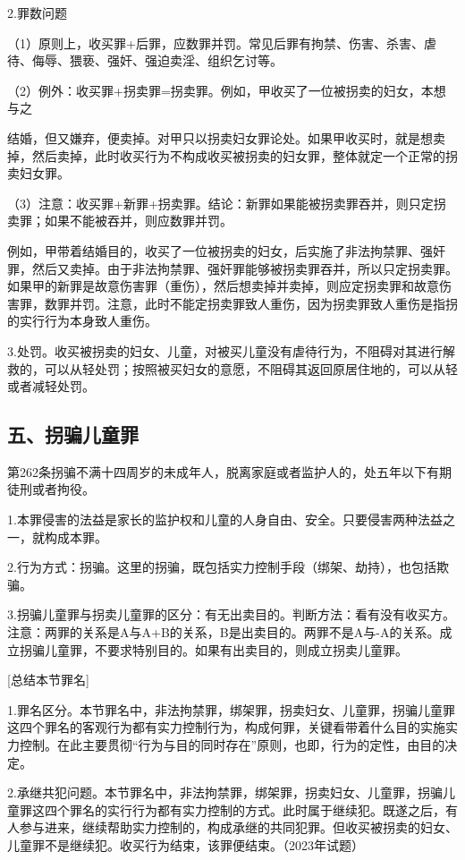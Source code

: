 2.罪数问题

（1）原则上，收买罪+后罪，应数罪并罚。常见后罪有拘禁、伤害、杀害、虐待、侮辱、猥亵、强奸、强迫卖淫、组织乞讨等。

（2）例外：收买罪+拐卖罪=拐卖罪。例如，甲收买了一位被拐卖的妇女，本想与之

结婚，但又嫌弃，便卖掉。对甲只以拐卖妇女罪论处。如果甲收买时，就是想卖掉，然后卖掉，此时收买行为不构成收买被拐卖的妇女罪，整体就定一个正常的拐卖妇女罪。

（3）注意：收买罪+新罪+拐卖罪。结论：新罪如果能被拐卖罪吞并，则只定拐卖罪；如果不能被吞并，则应数罪并罚。

例如，甲带着结婚目的，收买了一位被拐卖的妇女，后实施了非法拘禁罪、强奸罪，然后又卖掉。由于非法拘禁罪、强奸罪能够被拐卖罪吞并，所以只定拐卖罪。如果甲的新罪是故意伤害罪（重伤），然后想卖掉并卖掉，则应定拐卖罪和故意伤害罪，数罪并罚。注意，此时不能定拐卖罪致人重伤，因为拐卖罪致人重伤是指拐的实行行为本身致人重伤。

3.处罚。收买被拐卖的妇女、儿童，对被买儿童没有虐待行为，不阻碍对其进行解救的，可以从轻处罚；按照被买妇女的意愿，不阻碍其返回原居住地的，可以从轻或者减轻处罚。

\subsection*{五、拐骗儿童罪}

第262条拐骗不满十四周岁的未成年人，脱离家庭或者监护人的，处五年以下有期徒刑或者拘役。

1.本罪侵害的法益是家长的监护权和儿童的人身自由、安全。只要侵害两种法益之一，就构成本罪。

2.行为方式：拐骗。这里的拐骗，既包括实力控制手段（绑架、劫持），也包括欺骗。

3.拐骗儿童罪与拐卖儿童罪的区分：有无出卖目的。判断方法：看有没有收买方。注意：两罪的关系是A与A+B的关系，B是出卖目的。两罪不是A与-A的关系。成立拐骗儿童罪，不要求特别目的。如果有出卖目的，则成立拐卖儿童罪。

[总结本节罪名]

1.罪名区分。本节罪名中，非法拘禁罪，绑架罪，拐卖妇女、儿童罪，拐骗儿童罪这四个罪名的客观行为都有实力控制行为，构成何罪，关键看带着什么目的实施实力控制。在此主要贯彻“行为与目的同时存在”原则，也即，行为的定性，由目的决定。


2.承继共犯问题。本节罪名中，非法拘禁罪，绑架罪，拐卖妇女、儿童罪，拐骗儿童罪这四个罪名的实行行为都有实力控制的方式。此时属于继续犯。既遂之后，有人参与进来，继续帮助实力控制的，构成承继的共同犯罪。但收买被拐卖的妇女、儿童罪不是继续犯。收买行为结束，该罪便结束。（2023年试题）

